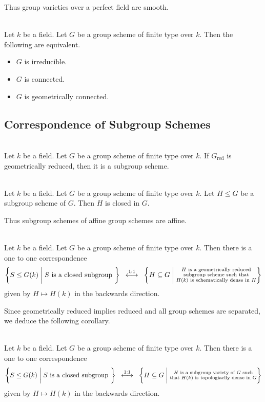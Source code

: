 \documentclass[a4paper]{article}
\begin{document}
Thus group varieties over a perfect field are smooth. 

\begin{prp}{}{}\\
Let $k$ be a field. Let $G$ be a group scheme of finite type over $k$. Then the following are equivalent. 
\begin{itemize}
\item $G$ is irreducible. 
\item $G$ is connected. 
\item $G$ is geometrically connected. 
\end{itemize}
\end{prp}

\subsection{Correspondence of Subgroup Schemes}
\begin{prp}{}{}\\
Let $k$ be a field. Let $G$ be a group scheme of finite type over $k$. If $G_\text{red}$ is geometrically reduced, then it is a subgroup scheme. 
\end{prp}

\begin{prp}{}{}\\
Let $k$ be a field. Let $G$ be a group scheme of finite type over $k$. Let $H\leq G$ be a subgroup scheme of $G$. Then $H$ is closed in $G$. 
\end{prp}

Thus subgroup schemes of affine group schemes are affine. 

\begin{prp}{}{}\\
Let $k$ be a field. Let $G$ be a group scheme of finite type over $k$. Then there is a one to one correspondence $$\left\{S\leq G(k)\;\bigg{|}\;S\text{ is a closed subgroup }\right\}\;\;\overset{1:1}{\longleftrightarrow}\;\;\left\{H\subseteq G\;\bigg{|}\;\substack{H\text{ is a geometrically reduced}\\\text{subgroup scheme such that}\\H(k)\text{ is schematically dense in }H}\right\}$$ given by $H\mapsto H(k)$ in the backwards direction. 
\end{prp}

Since geometrically reduced implies reduced and all group schemes are separated, we deduce the following corollary. 

\begin{crl}{}{}\\
Let $k$ be a field. Let $G$ be a group scheme of finite type over $k$. Then there is a one to one correspondence $$\left\{S\leq G(k)\;\bigg{|}\;S\text{ is a closed subgroup }\right\}\;\;\overset{1:1}{\longleftrightarrow}\;\;\left\{H\subseteq G\;\bigg{|}\;\substack{H\text{ is a subgroup variety of }G\text{ such}\\\text{that }H(k)\text{ is topologiaclly dense in }G}\right\}$$ given by $H\mapsto H(k)$ in the backwards direction. 
\end{crl}
\end{document}
